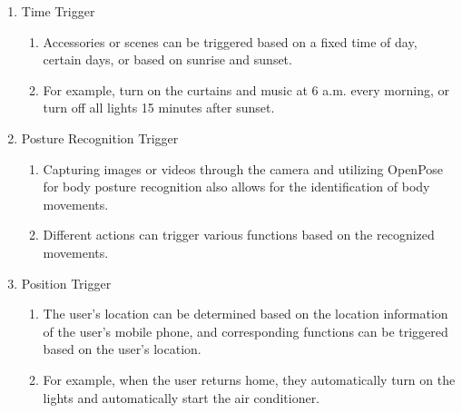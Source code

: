 \begin{enumerate}[label=\arabic*.]
\begin{enumerate}[label*={\arabic*.}]
\begin{enumerate}[label*={\alph*.},ref=\theenumi.\arabic*]
                        \item {\large{Time Trigger}}\\
                              \begin{enumerate}[label*={\arabic*.},ref=\theenumi.\arabic*]
                                  \setlength{\itemindent}{0.5cm}
                                  \item Accessories or scenes can be triggered based on a fixed time of day, certain days, or based on sunrise and sunset. \\
                                  \item For example, turn on the curtains and music at 6 a.m. every morning, or turn off all lights 15 minutes after sunset.\\
                              \end{enumerate}

                        \item {\large{Posture Recognition Trigger}}\\
                              \begin{enumerate}[label*={\arabic*.},ref=\theenumi.\arabic*]
                                  \setlength{\itemindent}{0.5cm}
                                  \item Capturing images or videos through the camera and utilizing OpenPose for body posture recognition also allows for the identification of body movements.\\
                                  \item Different actions can trigger various functions based on the recognized movements.\\
                              \end{enumerate}

                        \item {\large{Position Trigger}}\\
                              \begin{enumerate}[label*={\arabic*.},ref=\theenumi.\arabic*]
                                  \setlength{\itemindent}{0.5cm}
                                  \item The user's location can be determined based on the location information of the user's mobile phone, and corresponding functions can be triggered based on the user's location.\\
                                  \item For example, when the user returns home, they automatically turn on the lights and automatically start the air conditioner.\\
                              \end{enumerate}


\end{enumerate}
\end{enumerate}
\end{enumerate}
